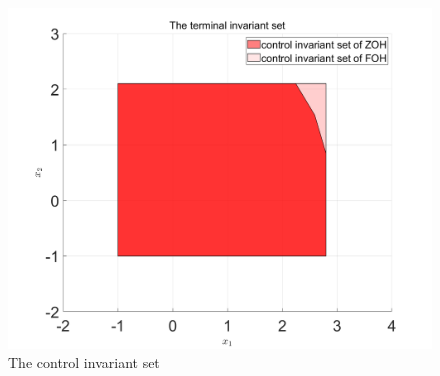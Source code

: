 \begin{figure}[H]
	\centering
	\includegraphics[width=\linewidth]{pics/gcinvariantset.png}
	\caption{The control invariant set}
	\label{fig:gsconinvset}
\end{figure}